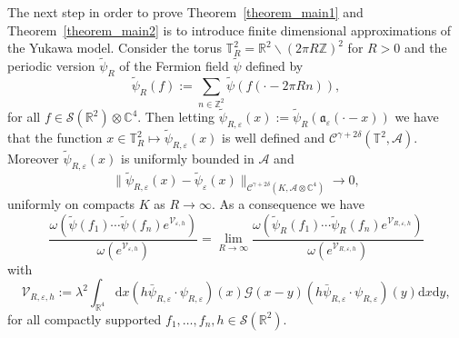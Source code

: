 \documentclass{article}
\newcommand{\assign}{:=}
\newcommand{\mathd}{\mathrm{d}}
\begin{document}
The next step in order to prove Theorem~\ref{theorem_main1} and
Theorem~\ref{theorem_main2} is to introduce finite dimensional approximations
of the Yukawa model. Consider the torus $\mathbb{T}_R^2 =\mathbb{R}^2
\backslash (2 \pi R\mathbb{Z})^2$ for $R > 0$ and the periodic version
$\tilde{\psi}_R$ of the Fermion field $\tilde{\psi}$ defined by
\[ \tilde{\psi}_R (f) \assign \sum_{n \in \mathbb{Z}^2} \tilde{\psi} (f (\cdot
   - 2 \pi R n)), \]
for all $f \in \mathcal{S} (\mathbb{R}^2) \otimes \mathbb{C}^4$. Then letting
$\tilde{\psi}_{R, \varepsilon} (x) \assign \tilde{\psi}_R
(\mathfrak{a}_{\varepsilon} (\cdot - x))$ we have that the function $x \in
\mathbb{T}^2_R \mapsto \tilde{\psi}_{R, \varepsilon} (x)$ is well defined and
$\mathcal{C}^{\gamma + 2 \delta} (\mathbb{T}^2, \mathcal{A})$. Moreover
$\tilde{\psi}_{R, \varepsilon} (x)$ is uniformly bounded in $\mathcal{A}$ and
\[ \| \tilde{\psi}_{R, \varepsilon} (x) - \tilde{\psi}_{\varepsilon} (x)
   \|_{\mathcal{C}^{\gamma + 2 \delta} (K, \mathcal{A} \otimes \mathbb{C}^4)}
   \rightarrow 0, \]
uniformly on compacts $K$ as $R \rightarrow \infty$. As a consequence we have
\begin{equation}
  \frac{\omega (\tilde{\psi} (f_1) \cdots \tilde{\psi} (f_n)
  e^{\mathcal{V}_{\varepsilon, h}})}{\omega (e^{\mathcal{V}_{\varepsilon,
  h}})} = \lim_{R \rightarrow \infty} \frac{\omega (\tilde{\psi}_R (f_1)
  \cdots \tilde{\psi}_R (f_n) e^{\mathcal{V}_{R, \varepsilon, h}})}{\omega
  (e^{\mathcal{V}_{R, \varepsilon, h}})}
  \label{eq:euclidean-yukawa-fermion-periodic}
\end{equation}
with
\[ \mathcal{V}_{R, \varepsilon, h} \assign \lambda^2 \int_{\mathbb{R}^4}
   \mathd x (h \bar{\psi}_{R, \varepsilon} \cdot \psi_{R, \varepsilon}) (x)
   \mathcal{G} (x - y) (h \bar{\psi}_{R, \varepsilon} \cdot \psi_{R,
   \varepsilon}) (y) \mathd x \mathd y, \]
for all compactly supported $f_1, \ldots, f_n, h \in \mathcal{S}
(\mathbb{R}^2)$.

\
\end{document}
